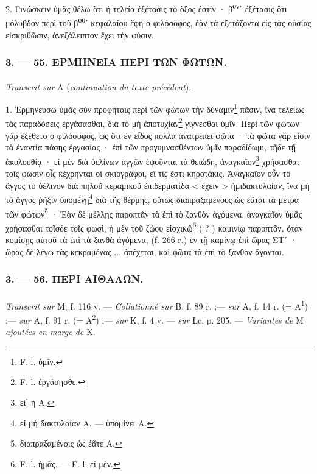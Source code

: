 \documentclass[landscape, a4paper, 11pt, oneside, polutonikogreek, french]{article}
\begin{document}
2. Γινώσκειν ὑμᾶς θέλω ὅτι ἡ τελεία ἐξέτασις τὸ ὄξος ἐστίν · β\textsuperscript{ον}ʹ ἐξέτασις ὅτι μόλυβδον περὶ τοῦ β\textsuperscript{ου}ʹ κεφαλαίου ἔφη ὁ φιλόσοφος, ἐὰν τὰ ἐξετάζοντα εἰς τὰς οὐσίας εἰσκριθῶσιν, ἀνεξάλειπτον ἔχει τὴν φύσιν.

\bigskip
\centerline{\EightStarTaper}
\centerline{\EightStarTaper\EightStarTaper}
\bigskip

\subsubsection{3. --- 55. ΕΡΜΗΝΕΙΑ ΠΕΡΙ ΤΩΝ ΦΩΤΩΝ.}
\paragraph{}
\emph{Transcrit sur} A (\emph{continuation du texte précédent}).

\bigskip

1. Ἑρμηνεύσω ὑμᾶς σὺν προφήταις περὶ τῶν φώτων τὴν δύναμιν\footnote{F. l. ὑμῖν.} πᾶσιν, ἵνα τελείως τὰς παραδόσεις ἐργάσασθαι, διὰ τὸ μὴ ἀποτυχίαν\footnote{F. l. ἐργάσησθε.} γίγνεσθαι ὑμῖν. Περὶ τῶν φώτων γὰρ ἐξέθετο ὁ φιλόσοφος, ὡς ὅτι ἓν εἶδος πολλὰ ἀνατρέπει φῶτα · τὰ φῶτα γάρ εἰσιν τὰ ἐναντία πάσης ἐργασίας · ἐπὶ τῶν προγυμνασθέντων ὑμῖν παραδίδωμι, τῇδε τῇ ἀκολουθίᾳ · εἰ μὲν διὰ ὑελίνων ἀγγῶν ἑψοῦνται τὰ θειώδη, ἀναγκαῖον\footnote{εἰ] ἡ A.} χρήσασθαι τοῖς φωσὶν οἷς κέχρηνται οἱ σκιογράφοι, εἴ τίς ἐστι κηροτάκις. Ἀναγκαῖον οὖν τὸ ἄγγος τὸ ὑέλινον διὰ πηλοῦ κεραμικοῦ ἐπιδερματίδα < ἔχειν > ἡμιδακτυλαίαν, ἵνα μὴ τὸ ἄγγος ῥῆξιν ὑπομένῃ\footnote{εἰ μὴ δακτυλαίαν A. --- ὑπομίνει A.} διὰ τῆς θέρμης, οὕτως διαπραξαμένους ὡς ἐᾶται τὰ μέτρα τῶν φώτων\footnote{διαπραξαμένοις ὡς ἐᾶτε A.} · Ἐὰν δὲ μέλλῃς παροπτᾶν τὰ ἐπὶ τὸ ξανθὸν ἀγόμενα, ἀναγκαῖον ὑμᾶς χρήσασθαι τοῖσδε τοῖς φωσὶ, ἡ μὲν τοῦ ζώου εἰσχικῷ\footnote{F. l. ἡμᾶς. --- F. l. εἰ μὲν.} ( ? ) καμινίῳ παροπτᾶν, ὅταν κομίσῃς αὐτοῦ τὰ ἐπὶ τὰ ξανθὰ ἀγόμενα, (f. 266 r.) ἐν τῇ καμίνῳ ἐπὶ ὥρας ΣΤʹ · ὥρας δὲ λέγω τὰς κεκραμένας ... ἀπέχεται, καὶ φῶτα τὰ ἐπὶ τὸ ξανθὸν ἄγονται.

\bigskip
\centerline{\EightStarTaper}
\centerline{\EightStarTaper\EightStarTaper}
\bigskip

\subsubsection{3. --- 56. ΠΕΡΙ ΑΙΘΑΛΩΝ.}
\paragraph{}
\emph{Transcrit sur} M, f. 116 v. --- \emph{Collationné sur} B, f. 89 r. ;--- \emph{sur} A, f. 14 r. (= A\textsuperscript{1}) ;--- \emph{sur} A, f. 91 r. (= A\textsuperscript{2}) ;--- \emph{sur} Κ, f. 4 v. --- \emph{sur} Lc, p. 205. --- \emph{Variantes de} M \emph{ajoutées en marge de} K.
\end{document}
